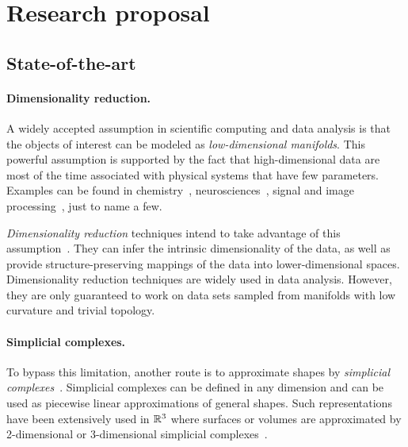 \section{Research proposal}

\subsection{State-of-the-art}

\paragraph{Dimensionality reduction.} A widely accepted assumption in scientific computing and data analysis is that the objects of interest can be modeled as {\em low-dimensional manifolds}. This powerful assumption is supported by the fact that high-dimensional data are most of the time associated with physical systems that have few parameters.  Examples can be found in chemistry~\cite{}, neurosciences~\cite{}, signal and image processing~\cite{}, just to name a few.

 {\em Dimensionality reduction} techniques intend to take advantage of this assumption~\cite{}.
They can infer the intrinsic dimensionality of the data, as well as provide structure-preserving mappings of the data  into lower-dimensional spaces. Dimensionality reduction techniques are widely used in data analysis. However, they are only guaranteed to work  on data sets sampled from manifolds with low curvature and trivial topology.

\paragraph{Simplicial complexes.} To bypass this limitation, another route is to approximate shapes by {\em simplicial complexes}~\cite{hh-ct-2010}. Simplicial complexes can be defined in any dimension and can be used as piecewise linear approximations of general shapes.
Such representations have been extensively used in $\mathbb R ^3$ where surfaces or volumes are approximated by 2-dimensional or 3-dimensional simplicial complexes~\cite{}. 


